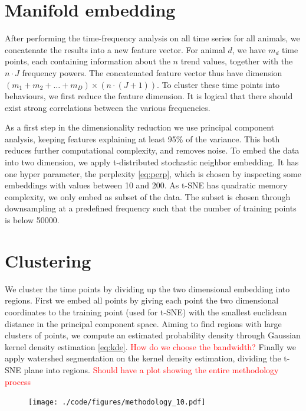 \documentclass[a4paper, 10pt]{memoir}
\theoremstyle{plain}
\theoremstyle{definition}
\theoremstyle{remark}
\begin{document}
\section{Manifold embedding}
After performing the time-frequency analysis on all time series for all animals, we concatenate the results into a new feature vector.
For animal $d$, we have $m_d$ time points, each containing information about the $n$ trend values, together with the $n \cdot J$ frequency powers.
The concatenated feature vector thus have dimension $(m_1 + m_2 + \hdots + m_D) \times (n \cdot (J + 1))$.
To cluster these time points into behaviours, we first reduce the feature dimension.
It is logical that there should exist strong correlations between the various frequencies.

As a first step in the dimensionality reduction we use principal component analysis, keeping features explaining at least 95\% of the variance.
This both reduces further computational complexity, and removes noise.
To embed the data into two dimension, we apply t-distributed stochastic neighbor embedding.
It has one hyper parameter, the perplexity \eqref{eq:perp}, which is chosen by inspecting some embeddings with values between 10 and 200.
As t-SNE has quadratic memory complexity, we only embed as subset of the data.
The subset is chosen through downsampling at a predefined frequency such that the number of training points is below 50000.


\section{Clustering}
We cluster the time points by dividing up the two dimensional embedding into regions.
First we embed all points by giving each point the two dimensional coordinates to the training point (used for t-SNE) with the smallest euclidean distance in the principal component space.
Aiming to find regions with large clusters of points, we compute an estimated probability density through Gaussian kernel density estimation \eqref{eq:kde}.
\textcolor{red}{How do we choose the bandwidth?}
Finally we apply watershed segmentation on the kernel density estimation, dividing the t-SNE plane into regions.
\textcolor{red}{Should have a plot showing the entire methodology process}


\begin{figure}[tb]
        \centering
        \texttt{[image: ./code/figures/methodology\_10.pdf]}
        \caption{}
        \label{fig:methodology_10}
\end{figure}
\end{document}

